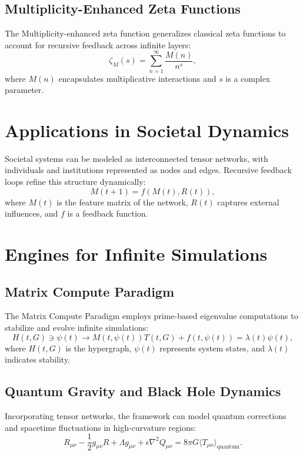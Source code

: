 \documentclass{article}
\theoremstyle{plain}
\begin{document}
\subsection{Multiplicity-Enhanced Zeta Functions}
The Multiplicity-enhanced zeta function generalizes classical zeta functions to account for recursive feedback across infinite layers:
\begin{equation}
\zeta_M(s) = \sum_{n=1}^\infty \frac{M(n)}{n^s},
\end{equation}
where $M(n)$ encapsulates multiplicative interactions and $s$ is a complex parameter.

\section{Applications in Societal Dynamics}
Societal systems can be modeled as interconnected tensor networks, with individuals and institutions represented as nodes and edges. Recursive feedback loops refine this structure dynamically:
\begin{equation}
M(t+1) = f(M(t), R(t)),
\end{equation}
where $M(t)$ is the feature matrix of the network, $R(t)$ captures external influences, and $f$ is a feedback function.

\section{Engines for Infinite Simulations}
\subsection{Matrix Compute Paradigm}
The Matrix Compute Paradigm employs prime-based eigenvalue computations to stabilize and evolve infinite simulations:
\begin{equation}
H(t, G) \ni \psi(t) \to M(t, \psi(t)) T(t, G) + f(t, \psi(t)) = \lambda(t) \psi(t),
\end{equation}
where $H(t, G)$ is the hypergraph, $\psi(t)$ represents system states, and $\lambda(t)$ indicates stability.

\subsection{Quantum Gravity and Black Hole Dynamics}
Incorporating tensor networks, the framework can model quantum corrections and spacetime fluctuations in high-curvature regions:
\begin{equation}
R_{\mu\nu} - \frac{1}{2} g_{\mu\nu} R + \Lambda g_{\mu\nu} + \epsilon \nabla^2 Q_{\mu\nu} = 8 \pi G \langle T_{\mu\nu} \rangle_{\text{quantum}}.
\end{equation}
\end{document}
